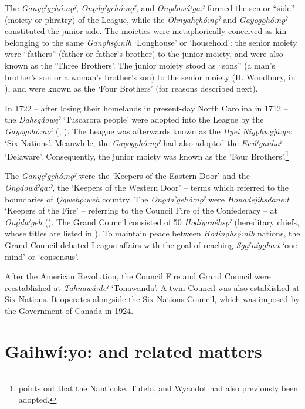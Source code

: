 The \textit{Ganyęˀge̱hó:nǫˀ}, \textit{Onǫda̱ˀgehó:nǫˀ}, and \textit{Onǫdowáˀga:ˀ} formed the senior “side” (moiety or phratry) of the League, while the \textit{Ohnyahęhó:nǫˀ} and \textit{Gayogo̱hó:nǫˀ} constituted the junior side. The moieties were metaphorically conceived as kin belonging to the same \textit{Ganǫhsǫ́:nih} ‘Longhouse’ or ‘household’: the senior moiety were “fathers” (father or father’s brother) to the junior moiety, and were also known as the ‘Three Brothers’. The junior moiety stood as “sons” (a man’s brother’s son or a woman’s brother’s son) to the senior moiety (H. Woodbury, in \cite[54--55]{fenton_great_1998}), and were known as the ‘Four Brothers’ (for reasons described next). 

In 1722 -- after losing their homelands in present-day North Carolina in 1712 -- the \textit{Dahsgáowęˀ} ‘Tuscarora people’ were adopted into the League by the \textit{Gayogo̱hó:nǫˀ} (\cite[54]{fenton_great_1998}, \cite[26]{schoolcraft_notes_1846}). The League was afterwards known as the \textit{Hyeí Niyǫhwęjá:ge:} ‘Six Nations’. Meanwhile, the \textit{Gayogo̱hó:nǫˀ} had also adopted the \textit{Ewáˀganhaˀ} ‘Delaware’. Consequently, the junior moiety was known as the ‘Four Brothers’.\footnote{\citet[117]{shimony_conservatism_1994} points out that the Nanticoke, Tutelo, and Wyandot had also previously been adopted.} 

The \textit{Ganyęˀge̱hó:nǫˀ} were the ‘Keepers of the Eastern Door’ and the \textit{Onǫdowáˀ\-ga:ˀ}, the ‘Keepers of the Western Door’ -- terms which referred to the boundaries of \textit{Ǫgwehǫ́:weh} country. The \textit{Onǫda̱ˀgehó:nǫˀ} were \textit{Honadejíhsdane:t} ‘Keepers of the Fire’ -- referring to the Council Fire of the Confederacy -- at \textit{Onǫ́da̱ˀgeh} (\cite[xxvi]{gibson_concerning_1992}). The Grand Council consisted of 50 \textit{Hodiyanéhsǫˀ} (hereditary chiefs, whose titles are listed in ). To maintain peace between \textit{Hodinǫ̱hsǫ́:nih} nations, the Grand Council debated League affairs with the goal of reaching \textit{Sga̱ˀnígǫ̱ha:t} ‘one mind’ or ‘consensus’.

After the American Revolution, the Council Fire and Grand Council were re\-established at \textit{Tahnawá:deˀ} ‘Tonawanda’. A twin Council was also established at Six Nations. It operates alongside the Six Nations Council, which was imposed by the Government of Canada in 1924.

\section{Gaihwí:yo: and related matters}
\label{gaihwiyo}

